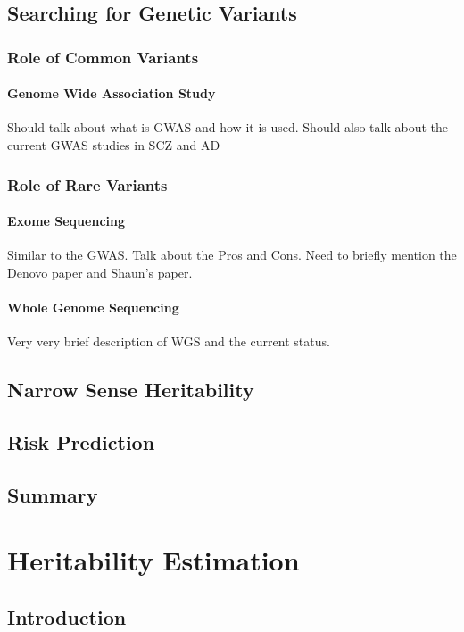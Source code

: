 \documentclass{book}
\begin{document}
	\section{Searching for Genetic Variants}
	\subsection{Role of Common Variants}
	\subsubsection{Genome Wide Association Study}
	Should talk about what is GWAS and how it is used.
	Should also talk about the current GWAS studies in SCZ and AD
	\subsection{Role of Rare Variants}
	\subsubsection{Exome Sequencing}
	Similar to the GWAS.
	Talk about the Pros and Cons.
	Need to briefly mention the Denovo paper and Shaun's paper.					
	\subsubsection{Whole Genome Sequencing}
	Very very brief description of WGS and the current status.
	\section{Narrow Sense Heritability}
	\section{Risk Prediction}
	\section{Summary}
	
	\chapter{Heritability Estimation}
	\section{Introduction}
\end{document}
